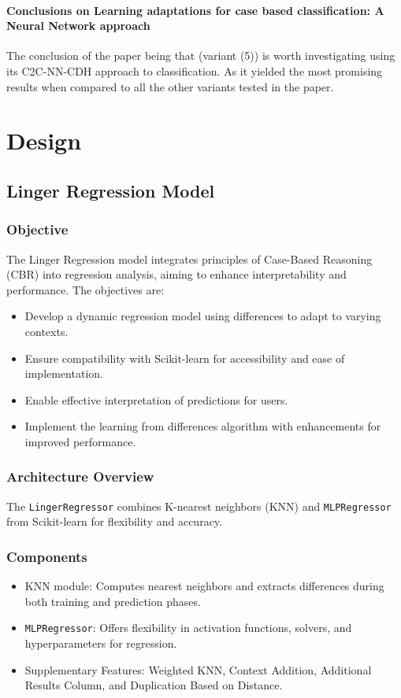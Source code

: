 \documentclass[a4paper, 12pt]{report}
\begin{document}
\subsubsection{Conclusions on Learning adaptations for case based classification: A Neural Network approach}
The conclusion of the paper \cite{ye2021learning} being that (variant (5)) is worth investigating using its C2C-NN-CDH approach to classification. 
As it yielded the most promising results when compared to all the other variants tested in the paper.


\chapter{Design}
\label{ch:Design}

\section{Linger Regression Model}

\subsection{Objective}
The Linger Regression model integrates principles of Case-Based Reasoning (CBR) into regression analysis, aiming to enhance interpretability and performance. The objectives are:
\begin{itemize}
    \item Develop a dynamic regression model using differences to adapt to varying contexts.
    \item Ensure compatibility with Scikit-learn for accessibility and ease of implementation.
    \item Enable effective interpretation of predictions for users.
    \item Implement the learning from differences algorithm with enhancements for improved performance.
\end{itemize}

\subsection{Architecture Overview}
The \texttt{LingerRegressor} combines K-nearest neighbors (KNN) and \texttt{MLPRegressor} from Scikit-learn for flexibility and accuracy.

\subsection{Components}
\begin{itemize}
    \item KNN module: Computes nearest neighbors and extracts differences during both training and prediction phases.
    \item \texttt{MLPRegressor}: Offers flexibility in activation functions, solvers, and hyperparameters for regression.
    \item Supplementary Features: Weighted KNN, Context Addition, Additional Results Column, and Duplication Based on Distance.
\end{itemize}
\end{document}
